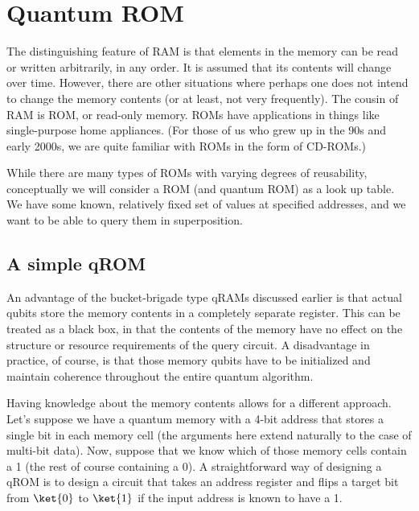 \documentclass[a4paper,12pt]{article}
\begin{document}
\section{Quantum ROM}
\label{sec:circuits}

The distinguishing feature of RAM is that elements in the memory can be read or written arbitrarily, in any order. It is assumed that its contents will change over time. However, there are other situations where perhaps one does not intend to change the memory contents (or at least, not very frequently). The cousin of RAM is ROM, or read-only memory. ROMs have applications in things like single-purpose home appliances. (For those of us who grew up in the 90s and early 2000s, we are quite familiar with ROMs in the form of CD-ROMs.)

While there are many types of ROMs with varying degrees of reusability, conceptually we will consider a ROM (and quantum ROM) as a look up table. We have some known, relatively fixed set of values at specified addresses, and we want to be able to query them in superposition.

\subsection{A simple qROM}

An advantage of the bucket-brigade type qRAMs discussed earlier is that actual qubits store the memory contents in a completely separate register. This can be treated as a black box, in that the contents of the memory have no effect on the structure or resource requirements of the query circuit. A disadvantage in practice, of course, is that those memory qubits have to be initialized and maintain coherence throughout the entire quantum algorithm.

Having knowledge about the memory contents allows for a different approach. Let's suppose we have a quantum memory with a 4-bit address that stores a single bit in each memory cell (the arguments here extend naturally to the case of multi-bit data). Now, suppose that we know which of those memory cells contain a 1 (the rest of course containing a 0). A straightforward way of designing a qROM is to design a circuit that takes an address register and flips a target bit from $\ket{0}$ to $\ket{1}$ if the input address is known to have a 1.
\end{document}

